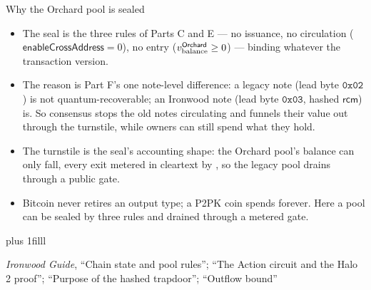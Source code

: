 \documentclass[aspectratio=169,11pt]{beamer}
\newcommand{\rcm}{\ensuremath{\mathsf{rcm}}}
\newcommand{\src}[1]{\par\vskip0pt plus 1filll
  {\fontsize{6}{7.2}\selectfont\color{arbdim}\raggedright #1\par}}
\begin{document}
\begin{frame}{Why the Orchard pool is sealed}
\small
\begin{itemize}
  \item The seal is the three rules of Parts C and E --- no issuance, no
    circulation ($\mathsf{enableCrossAddress} = 0$), no entry
    ($v_{\mathrm{balance}}^{\mathsf{Orchard}} \ge 0$) --- binding whatever the transaction version.
  \item The reason is Part F's one note-level difference: a legacy note
    (lead byte $\mathtt{0x02}$) is not quantum-recoverable; an Ironwood
    note (lead byte $\mathtt{0x03}$, hashed \rcm) is. So consensus stops
    the old notes circulating and funnels their value out through the
    turnstile, while owners can still spend what they hold.
  \item The turnstile is the seal's accounting shape: the Orchard pool's
    balance can only fall, every exit metered in cleartext by \Hvbo, so
    the legacy pool drains through a public gate.
  \item Bitcoin never retires an output type; a P2PK coin spends
    forever. Here a pool can be sealed by three rules and drained
    through a metered gate.
\end{itemize}
\src{\emph{Ironwood Guide}, ``Chain state and pool rules''; ``The Action circuit
  and the Halo 2 proof''; ``Purpose of the hashed trapdoor''; ``Outflow bound''}
\end{frame}
\end{document}
